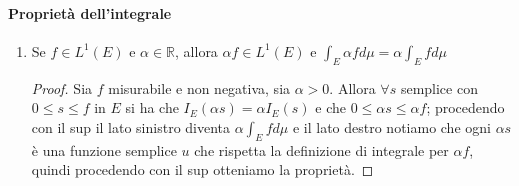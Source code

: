 \paragraph{Proprietà dell'integrale}
\begin{enumerate}[label = \arabic*.]
    \item Se \(f \in L^{1}(E)\) e \(\alpha \in \mathbb{R}\), allora \(\alpha f
        \in  L^{1}(E)\) e \(\int_E \alpha f d\mu = \alpha \int_E f d\mu\) 
    \begin{proof}
        Sia \(f\) misurabile e non negativa, sia \(\alpha > 0\). Allora
        \(\forall s\) semplice con \(0 \le s \le f\) in \(E\) si ha che
        \(I_E(\alpha s) = \alpha I_E(s)\) e che \(0 \le \alpha s \le \alpha f\);
         procedendo con il sup il lato sinistro diventa \(\alpha \int_E f d\mu\)
         e il lato destro notiamo che ogni \(\alpha s\) è una funzione semplice
         \(u\) che rispetta la definizione di integrale per \(\alpha f\), quindi
         procedendo con il sup otteniamo la proprietà. 


\end{proof}
\end{enumerate}
